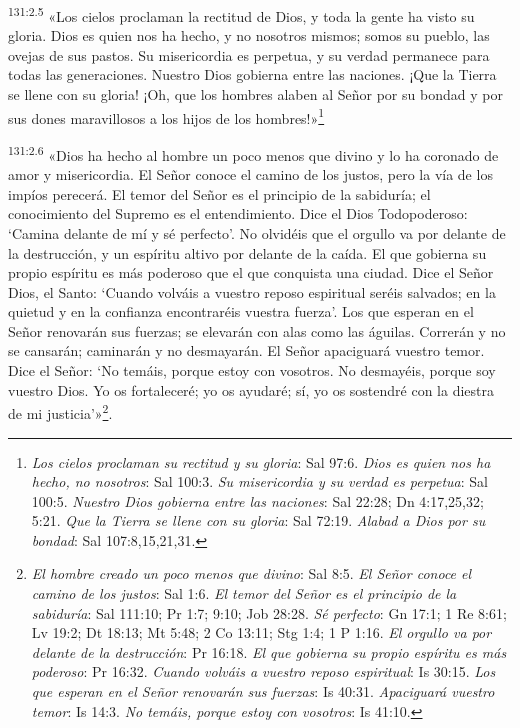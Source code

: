 \par 
\textsuperscript{131:2.5} «Los cielos proclaman la rectitud de Dios, y toda la gente ha visto su gloria. Dios es quien nos ha hecho, y no nosotros mismos; somos su pueblo, las ovejas de sus pastos. Su misericordia es perpetua, y su verdad permanece para todas las generaciones. Nuestro Dios gobierna entre las naciones. ¡Que la Tierra se llene con su gloria! ¡Oh, que los hombres alaben al Señor por su bondad y por sus dones maravillosos a los hijos de los hombres!»\footnote{\textit{Los cielos proclaman su rectitud y su gloria}: Sal 97:6. \textit{Dios es quien nos ha hecho, no nosotros}: Sal 100:3. \textit{Su misericordia y su verdad es perpetua}: Sal 100:5. \textit{Nuestro Dios gobierna entre las naciones}: Sal 22:28; Dn 4:17,25,32; 5:21. \textit{Que la Tierra se llene con su gloria}: Sal 72:19. \textit{Alabad a Dios por su bondad}: Sal 107:8,15,21,31.}

\par 
\textsuperscript{131:2.6} «Dios ha hecho al hombre un poco menos que divino y lo ha coronado de amor y misericordia. El Señor conoce el camino de los justos, pero la vía de los impíos perecerá. El temor del Señor es el principio de la sabiduría; el conocimiento del Supremo es el entendimiento. Dice el Dios Todopoderoso: `Camina delante de mí y sé perfecto'. No olvidéis que el orgullo va por delante de la destrucción, y un espíritu altivo por delante de la caída. El que gobierna su propio espíritu es más poderoso que el que conquista una ciudad. Dice el Señor Dios, el Santo: `Cuando volváis a vuestro reposo espiritual seréis salvados; en la quietud y en la confianza encontraréis vuestra fuerza'. Los que esperan en el Señor renovarán sus fuerzas; se elevarán con alas como las águilas. Correrán y no se cansarán; caminarán y no desmayarán. El Señor apaciguará vuestro temor. Dice el Señor: `No temáis, porque estoy con vosotros. No desmayéis, porque soy vuestro Dios. Yo os fortaleceré; yo os ayudaré; sí, yo os sostendré con la diestra de mi justicia'»\footnote{\textit{El hombre creado un poco menos que divino}: Sal 8:5. \textit{El Señor conoce el camino de los justos}: Sal 1:6. \textit{El temor del Señor es el principio de la sabiduría}: Sal 111:10; Pr 1:7; 9:10; Job 28:28. \textit{Sé perfecto}: Gn 17:1; 1 Re 8:61; Lv 19:2; Dt 18:13; Mt 5:48; 2 Co 13:11; Stg 1:4; 1 P 1:16. \textit{El orgullo va por delante de la destrucción}: Pr 16:18. \textit{El que gobierna su propio espíritu es más poderoso}: Pr 16:32. \textit{Cuando volváis a vuestro reposo espiritual}: Is 30:15. \textit{Los que esperan en el Señor renovarán sus fuerzas}: Is 40:31. \textit{Apaciguará vuestro temor}: Is 14:3. \textit{No temáis, porque estoy con vosotros}: Is 41:10.}.

